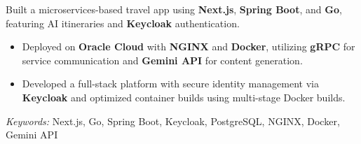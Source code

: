 \nointent 
{}
 
\nointent 
Built a microservices-based travel app using \textbf{Next.js}, \textbf{Spring Boot}, and \textbf{Go}, featuring AI itineraries and \textbf{Keycloak} authentication. 
 
\begin{itemize} 
    \item Deployed on \textbf{Oracle Cloud} with \textbf{NGINX} and \textbf{Docker}, utilizing \textbf{gRPC} for service communication and \textbf{Gemini API} for content generation. 
    \item Developed a full-stack platform with secure identity management via \textbf{Keycloak} and optimized container builds using multi-stage Docker builds. 
\end{itemize} 
 
\nointent 
\textit{Keywords:} Next.js, Go, Spring Boot, Keycloak, PostgreSQL, NGINX, Docker, Gemini API 
